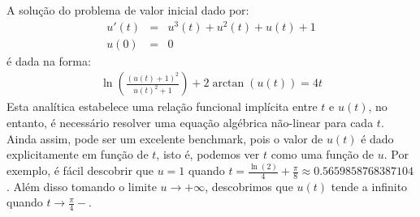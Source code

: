  \begin{ex} A solução do problema de valor inicial dado por:
\begin{eqnarray*}
u'(t)&=&u^3(t)+u^2(t)+u(t)+1\\
u(0)&=&0
\end{eqnarray*}
é dada na forma:
\begin{eqnarray*}
\ln  \left(\frac{\left(u(t) +1\right)^2}{u(t)^2+1}\right) +2\arctan \left( u \left( t \right)  \right) =4t
\end{eqnarray*}
Esta analítica estabelece uma relação funcional implícita entre $t$ e $u(t)$, no entanto, é necessário resolver uma equação algébrica não-linear para cada $t$. Ainda assim, pode ser um excelente benchmark, pois o valor de $u(t)$ é dado explicitamente em função de $t$, isto é, podemos ver $t$ como uma função de $u$. Por exemplo, é fácil descobrir que $u=1$ quando $t=\frac{\ln(2)}{4}+\frac{\pi}{8}\approx 0.5659858768387104$. Além disso tomando o limite $u\to +\infty$, descobrimos que $u(t)$ tende a infinito quando $t\to \frac{\pi}{4}-$.
\end{ex}

